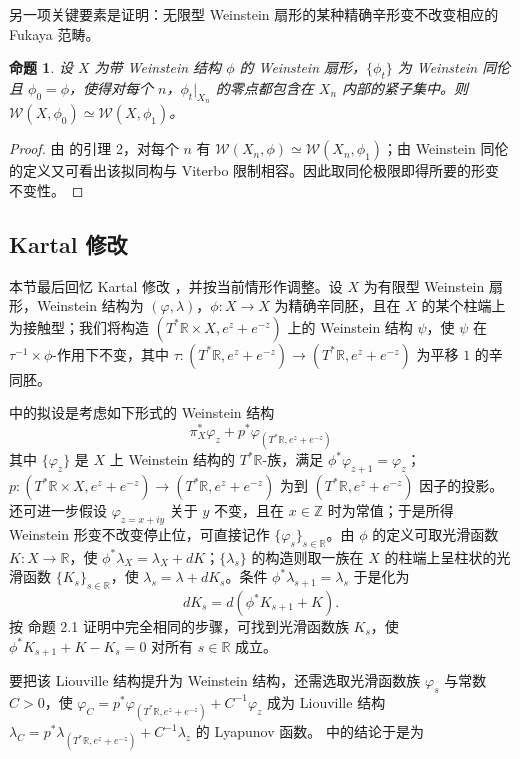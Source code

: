 \documentclass[11pt,a4paper]{article}
\theoremstyle{cnth}
\newtheorem{prp}[thm]{命题}
\begin{document}
    另一项关键要素是证明：无限型 Weinstein 扇形的某种精确辛形变不改变相应的 Fukaya 范畴。
\begin{prp}\label{prp:deformation-invariance-Fukaya}
    设 $X$ 为带 Weinstein 结构 $\phi$ 的 Weinstein 扇形，$\{\phi_t\}$ 为 Weinstein 同伦且 $\phi_0=\phi$，使得对每个 $n$，$\phi_t\vert_{X_n}$ 的零点都包含在 $X_n$ 内部的紧子集中。则 $\mathcal{W} (X,\phi_0)\simeq\mathcal{W} (X,\phi_1)$。
\end{prp}
\begin{proof}
    由 \cite{Jeffs22} 的引理 2，对每个 $n$ 有 $\mathcal{W} (X_n,\phi)\simeq\mathcal{W} (X_n,\phi_1)$；由 Weinstein 同伦的定义又可看出该拟同构与 Viterbo 限制相容。因此取同伦极限即得所要的形变不变性。
\end{proof}

\subsection{Kartal 修改}
    本节最后回忆 Kartal 修改 \cite{Kartal21}，并按当前情形作调整。设 $X$ 为有限型 Weinstein 扇形，Weinstein 结构为 $(\varphi,\lambda)$，$\phi\colon X\to X$ 为精确辛同胚，且在 $X$ 的某个柱端上为接触型；我们将构造 $(T^{\ast}\mathbb{R}\times X,e^z+e^{-z})$ 上的 Weinstein 结构 $\psi$，使 $\psi$ 在 $\tau^{-1}\times\phi$-作用下不变，其中 $\tau\colon (T^{\ast}\mathbb{R},e^z+e^{-z})\to (T^{\ast}\mathbb{R},e^z+e^{-z})$ 为平移 $1$ 的辛同胚。\par
    \cite{Kartal21} 中的拟设是考虑如下形式的 Weinstein 结构
\[
\pi_X^{\ast}\varphi_z +p^{\ast}\varphi_{(T^{\ast}\mathbb{R},e^z+e^{-z})}
\]
其中 $\{\varphi_z\}$ 是 $X$ 上 Weinstein 结构的 $T^{\ast}\mathbb{R}$-族，满足 $\phi^{\ast}\varphi_{z+1}=\varphi_z$；$p\colon (T^{\ast}\mathbb{R}\times X,e^z+e^{-z})\to (T^{\ast}\mathbb{R},e^z+e^{-z})$ 为到 $(T^{\ast}\mathbb{R},e^z+e^{-z})$ 因子的投影。还可进一步假设 $\varphi_{z=x+iy}$ 关于 $y$ 不变，且在 $x\in\mathbb{Z}$ 时为常值；于是所得 Weinstein 形变不改变停止位，可直接记作 $\{\varphi_s\}_{s\in\mathbb{R}}$。由 $\phi$ 的定义可取光滑函数 $K\colon X\to\mathbb{R}$，使 $\phi^{\ast}\lambda_X=\lambda_X+dK$；$\{\lambda_s\}$ 的构造则取一族在 $X$ 的柱端上呈柱状的光滑函数 $\{K_s\}_{s\in\mathbb{R}}$，使 $\lambda_s =\lambda +dK_s$。条件 $\phi^{\ast}\lambda_{s+1}=\lambda_s$ 于是化为
\[
    dK_s=d(\phi^{\ast} K_{s+1}+K).
\]
按 \cite{Kartal21} 命题 2.1 证明中完全相同的步骤，可找到光滑函数族 $K_s$，使 $\phi^{\ast} K_{s+1} +K-K_s=0$ 对所有 $s\in\mathbb{R}$ 成立。\par
    要把该 Liouville 结构提升为 Weinstein 结构，还需选取光滑函数族 $\varphi_s$ 与常数 $C>0$，使 $\varphi_C =p^{\ast}\varphi_{(T^{\ast}\mathbb{R},e^z+e^{-z})} +C^{-1}\varphi_z$ 成为 Liouville 结构 $\lambda_C =p^{\ast}\lambda_{(T^{\ast}\mathbb{R},e^z+e^{-z})} +C^{-1}\lambda_z$ 的 Lyapunov 函数。\cite{Kartal21} 中的结论于是为
\end{document}
